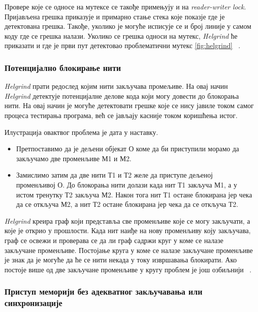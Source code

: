 \documentclass[12pt,oneside]{memoir}
\begin{document}
\indent Провере које се односе на мутексе се такође примењују и на \textit{reader-writer lock}. Пријављена грешка приказује и примарно стање стека које показје где је детектована грешка. Такође, уколико је могуће исписује се и број линије у самом коду где се грешка налази. Уколико се грешка односи на мутекс, \textit{Helgrind} ће приказати и где је први пут детектовао проблематични мутекс \ref{fig:helgrind} ~\cite{helgrindRef}. 

\subsubsection{Потенцијално блокирање нити}

\indent \textit{Helgrind} прати редослед којим нити закључава промељиве. На овај начин \textit{Helgrind} детектује потенцијалне делове кода који могу довести до блокорања нити. На овај начин је могуће детектовати грешке које се нису јавиле током самог процеса тестирања програма, већ се јављају касније током коришћења истог.

\indent Илустрација овактвог проблема је дата у наставку.

\begin{itemize}
  \item Претпоставимо да је дељени објекат О коме да би приступили морамо да закључамо две променљиве М1 и М2.
  \item  Замислимо затим да две нити Т1 и Т2 желе да приступе дељеној променљивој О. До блокорања нити долази када нит Т1 закључа М1, а у истом тренутку Т2 закључа М2. Након тога нит Т1 остане блокирана јер чека да се откључа М2, а нит Т2 остане блокирана јер чека да се откључа Т2.
\end{itemize}


\indent \textit{Helgrind} креира граф који представља све променљиве које се могу закључати, а које је открио у прошлости. Када нит наиђе на нову променљиву коју закључава, граф се освежи и проверава се да ли граф садржи круг у коме се налазе закључане променљиве. Постојање круга у коме се налазе закључане променљиве је знак да је могуће да ће се нити некада у току извршавања блокирати. Ако постоје више од две закључане променљиве у кругу проблем је још озбиљнији ~\cite{helgrindRef}.


\subsubsection{Приступ меморији без адекватног закључавања или синхронизације}
\end{document}
